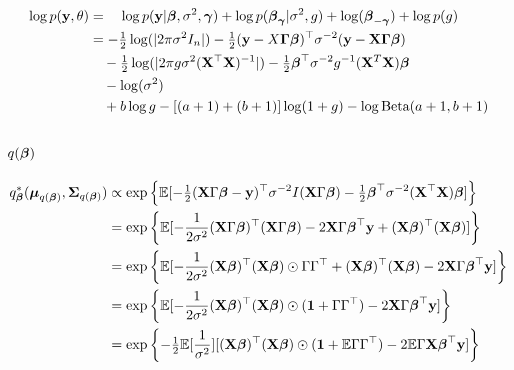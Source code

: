 \documentclass{amsart}[12pt]
\begin{document}
\begin{align*}
	\log p({\bf y}, \theta) & = \quad\log p({\bf y}|{\boldsymbol \beta}, \sigma^2, {\boldsymbol \gamma}) + \log p({\boldsymbol \beta}_{\boldsymbol \gamma} | \sigma^2, g) + \log({\boldsymbol \beta}_{-{\boldsymbol \gamma}}) + \log p(g) \\
	                    & = -\tfrac{1}{2} \log(|2 \pi \sigma^2 I_n|) - \tfrac{1}{2} ({\bf y} - X {\boldsymbol \Gamma} {\boldsymbol \beta})^\top \sigma^{-2} ({\bf y} - {\bf X} {\boldsymbol \Gamma} {\boldsymbol \beta})          \\
	                    & \quad -\tfrac{1}{2} \log(|2 \pi g \sigma^2 ({\bf X}^\top {\bf X})^{-1}|) -\tfrac{1}{2} {\boldsymbol \beta}^\top \sigma^{-2} g^{-1} ({\bf X}^T {\bf X}) {\boldsymbol \beta}        \\
	                    & \quad - \log (\sigma^2)                                                                                                   \\
	                    & \quad + b \log g - [(a + 1) + (b + 1)] \log (1 + g) - \log \text{Beta}(a + 1, b + 1)                                            
\end{align*}

\subsection{$q({\boldsymbol \beta})$}
\begin{align*}
	q_{\boldsymbol \beta}^*({\boldsymbol \mu}_{q({\boldsymbol \beta})}, {\boldsymbol \Sigma}_{q({\boldsymbol \beta})}) & \propto \exp \left\{ \mathbb{E}[-\tfrac{1}{2} ({\bf X} \Gamma {\boldsymbol\beta} - {\bf y})^\top \sigma^{-2} I ({\bf X} \Gamma {\boldsymbol\beta}) - \tfrac{1}{2} {\boldsymbol \beta}^\top \sigma^{-2} ({\bf X}^\top {\bf X}) {\boldsymbol \beta}] \right\}           \\
	                                                  & = \exp \left\{ \mathbb{E}[-\frac{1}{2 \sigma^2} ({\bf X} \Gamma {\boldsymbol\beta})^\top ({\bf X} \Gamma {\boldsymbol\beta}) - 2 {\bf X} \Gamma {\boldsymbol\beta}^\top {\bf y} + ({\bf X} {\boldsymbol \beta})^\top ({\bf X} {\boldsymbol \beta})] \right\}            \\
	                                                  & = \exp \left\{ \mathbb{E}[-\frac{1}{2 \sigma^2} ({\bf X} {\boldsymbol \beta})^\top ({\bf X} {\boldsymbol \beta}) \odot \Gamma \Gamma^\top + ({\bf X} {\boldsymbol \beta})^\top ({\bf X} {\boldsymbol \beta}) - 2 {\bf X} \Gamma {\boldsymbol\beta}^\top {\bf y}] \right\} \\
	                                                  & = \exp \left\{ \mathbb{E}[-\frac{1}{2 \sigma^2} ({\bf X} {\boldsymbol \beta})^\top ({\bf X} {\boldsymbol \beta}) \odot ({\bf 1} + \Gamma \Gamma^\top) - 2 {\bf X} \Gamma {\boldsymbol\beta}^\top {\bf y}] \right\}                        \\
	                                                  & = \exp \left\{ -\tfrac{1}{2} \mathbb{E}[\frac{1}{\sigma^2}] [({\bf X} {\boldsymbol \beta})^\top ({\bf X} {\boldsymbol \beta}) \odot ({\bf 1} + \mathbb{E} \Gamma \Gamma^\top) - 2 \mathbb{E} \Gamma {\bf X} {\boldsymbol\beta}^\top {\bf y}] \right\}            
\end{align*}
\end{document}
